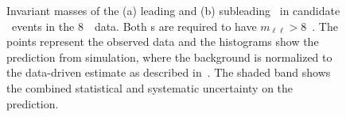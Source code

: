 \begin{figure}[htbp]
    \begin{center}
    \caption[Invariant masses of the (a) leading and (b) subleading \leppair\
    in candidate \ZZ\ events in the 8~\tev\ data.]
    {Invariant masses of the (a) leading and (b) subleading \leppair\
    in candidate \ZZ\ events in the 8~\tev\ data. Both \leppair s are required to have
    $m_{\ell\ell}>8$~\gev.  The points represent the observed data and the
    histograms show the prediction from simulation, where the background is
    normalized to the data-driven estimate as described in~. 
    The shaded band shows the combined statistical and
    systematic uncertainty on the prediction. 
}
    \label{fig:zzdists-Zmass-eight}
\end{center}
\end{figure}


